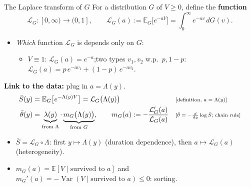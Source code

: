 \documentclass[aspectratio=169,10pt]{beamer}
\newcommand{\E}{\mathbb{E}}
\newcommand{\Lap}{\mathcal{L}}
\newcommand{\var}{\operatorname{Var}}
\newcommand{\why}[1]{\text{\scriptsize[#1]}}
\begin{document}
\begin{frame}[label=m-lap]{The Laplace transform of $G$}
  For a distribution $G$ of $V\ge0$, define the \textbf{function}
  \[ \Lap_G:[0,\infty)\to(0,1],\qquad \Lap_G(a):=\E_G\big[e^{-aV}\big]=\int_0^\infty e^{-av}\,dG(v). \]
  \begin{itemize}
    \item \emph{Which} function $\Lap_G$ is depends only on $G$:
      \begin{itemize}
        \item $V\equiv1$: $\Lap_G(a)=e^{-a}$;\quad two types $v_1,v_2$ w.p.\ $p,1-p$: $\Lap_G(a)=p\,e^{-av_1}+(1-p)\,e^{-av_2}$.
      \end{itemize}
  \end{itemize}
  \textbf{Link to the data:} plug in $a=\Lambda(y)$.
  \begin{align*}
    \bar S(y) &= \E_G\big[e^{-\Lambda(y)V}\big] = \Lap_G\big(\Lambda(y)\big) && \why{definition, $a=\Lambda(y)$} \\
    \bar\theta(y) &= \underbrace{\lambda(y)}_{\text{from }\Lambda}\cdot\underbrace{m_G\big(\Lambda(y)\big)}_{\text{from }G}, \qquad m_G(a):=-\frac{\Lap_G'(a)}{\Lap_G(a)} && \why{$\bar\theta=-\tfrac{d}{dy}\log\bar S$; chain rule}
  \end{align*}
  \begin{itemize}
    \item $\bar S=\Lap_G\circ\Lambda$: first $y\mapsto\Lambda(y)$ (duration dependence), then $a\mapsto\Lap_G(a)$ (heterogeneity).
    \item $m_G(a)=\E[V\mid\text{survived to }a]$ and $m_G'(a)=-\var(V\mid\text{survived to }a)\le0$: sorting.
  \end{itemize}
  \vfill\hfill\hyperlink{p-lap}{}
\end{frame}
\end{document}
